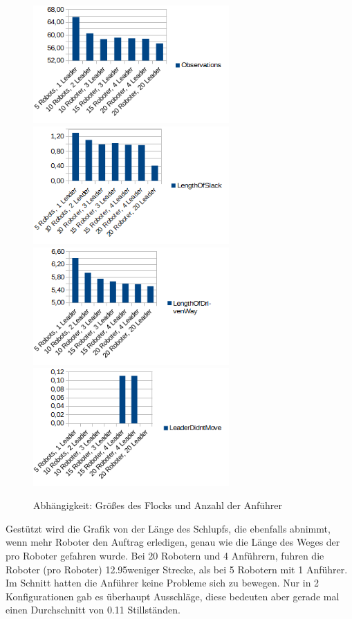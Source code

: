 \begin{figure}[h]
	\includegraphics[width=7.5cm,keepaspectratio]{graphics/Statistics/Transport/Number_Observations.png}
	\includegraphics[width=7.5cm,keepaspectratio]{graphics/Statistics/Transport/Number_Slack.png}
	\includegraphics[width=7.5cm,keepaspectratio]{graphics/Statistics/Transport/Number_Way.png}
	\includegraphics[width=7.5cm,keepaspectratio]{graphics/Statistics/Transport/Number_Move.png}
	\caption{Abhängigkeit: Größes des Flocks und Anzahl der Anführer}
	\label{pic:TransportNumber}
\end{figure}

Gestützt wird die Grafik von der Länge des Schlupfs, die ebenfalls abnimmt, wenn mehr Roboter den Auftrag erledigen, genau wie die Länge des Weges der pro Roboter gefahren wurde. Bei 20 Robotern und 4 Anführern, fuhren die Roboter (pro Roboter) 12.95\per weniger Strecke, als bei 5 Robotern mit 1 Anführer.
Im Schnitt hatten die Anführer keine Probleme sich zu bewegen. Nur in 2 Konfigurationen gab es überhaupt Ausschläge, diese bedeuten aber gerade mal einen Durchschnitt von 0.11 Stillständen.

